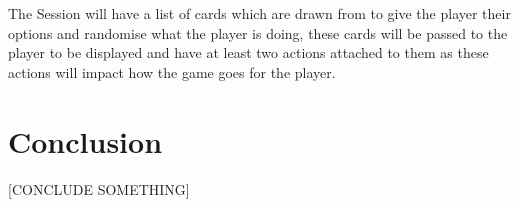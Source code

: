 \documentclass{article}
\begin{document}
The Session will have a list of cards which are drawn from to give the player their options and randomise what the player is doing, these cards will be passed to the player to be displayed and have at least two actions attached to them as these actions will impact how the game goes for the player.



\section{Conclusion}
[CONCLUDE SOMETHING]


\printbibliography[filter=papers]
\printbibliography[type=software, title={Games}]

\listoffigures
\end{document}
